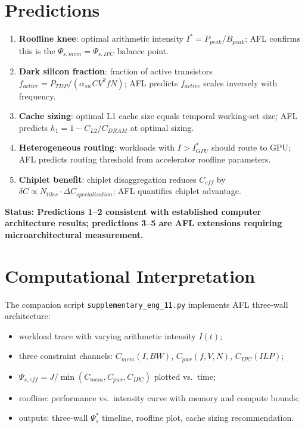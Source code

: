 \documentclass[11pt]{article}
\begin{document}
\section{Predictions}

\begin{enumerate}
    \item \textbf{Roofline knee}: optimal arithmetic intensity $I^* = P_{peak}/B_{peak}$;
          AFL confirms this is the $\Psi_{s,mem} = \Psi_{s,IPC}$ balance point.
    \item \textbf{Dark silicon fraction}: fraction of active transistors $f_{active} = P_{TDP}/
          (\alpha_{sw} C V^2 f N)$; AFL predicts $f_{active}$ scales inversely with frequency.
    \item \textbf{Cache sizing}: optimal L1 cache size equals temporal working-set size;
          AFL predicts $h_1 = 1 - C_{L2}/C_{DRAM}$ at optimal sizing.
    \item \textbf{Heterogeneous routing}: workloads with $I > I^* _{GPU}$ should route to GPU;
          AFL predicts routing threshold from accelerator roofline parameters.
    \item \textbf{Chiplet benefit}: chiplet disaggregation reduces $C_{eff}$ by $\delta C \propto
          N_{tiles} \cdot \Delta C_{specialisation}$; AFL quantifies chiplet advantage.
\end{enumerate}

\textbf{Status: Predictions 1--2 consistent with established computer architecture results;
predictions 3--5 are AFL extensions requiring microarchitectural measurement.}

\section{Computational Interpretation}

The companion script \texttt{supplementary\_eng\_11.py} implements AFL three-wall architecture:
\begin{itemize}
    \item workload trace with varying arithmetic intensity $I(t)$;
    \item three constraint channels: $C_{mem}(I, BW)$, $C_{pwr}(f, V, N)$, $C_{IPC}(ILP)$;
    \item $\Psi_{s,eff} = J/\min(C_{mem}, C_{pwr}, C_{IPC})$ plotted vs.\ time;
    \item roofline: performance vs.\ intensity curve with memory and compute bounds;
    \item outputs: three-wall $\Psi_s^*$ timeline, roofline plot, cache sizing recommendation.
\end{itemize}
\end{document}
